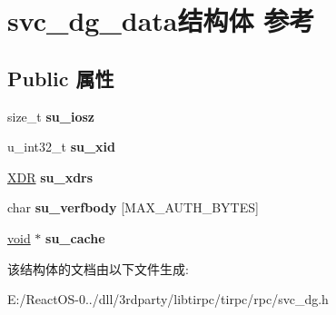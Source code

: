 \hypertarget{structsvc__dg__data}{}\section{svc\+\_\+dg\+\_\+data结构体 参考}
\label{structsvc__dg__data}
\subsection*{Public 属性}
\begin{DoxyCompactItemize}
\item 
\mbox{\label{structsvc__dg__data_af8d4eae4af84bbc2d728aa66a9cdbb27}} 
size\+\_\+t {\bfseries su\+\_\+iosz}
\item 
\mbox{\label{structsvc__dg__data_ab8b3d547b4107bc90aa304b4108f38a0}} 
u\+\_\+int32\+\_\+t {\bfseries su\+\_\+xid}
\item 
\mbox{\label{structsvc__dg__data_a31dd5dcac22d707171a179aa3c96f3fa}} 
\hyperlink{struct____rpc__xdr}{X\+DR} {\bfseries su\+\_\+xdrs}
\item 
\mbox{\label{structsvc__dg__data_a85cf342bf75f476c9b8dfbff5a8339e6}} 
char {\bfseries su\+\_\+verfbody} \mbox{[}M\+A\+X\+\_\+\+A\+U\+T\+H\+\_\+\+B\+Y\+T\+ES\mbox{]}
\item 
\mbox{\label{structsvc__dg__data_a4e71570db50fa08bf51ea1ac11b7f9a3}} 
\hyperlink{interfacevoid}{void} $\ast$ {\bfseries su\+\_\+cache}
\end{DoxyCompactItemize}


该结构体的文档由以下文件生成\+:\begin{DoxyCompactItemize}
\item 
E\+:/\+React\+O\+S-\/0../dll/3rdparty/libtirpc/tirpc/rpc/svc\+\_\+dg.\+h\end{DoxyCompactItemize}

